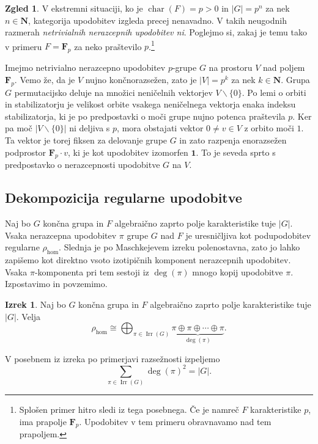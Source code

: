 \documentclass[11pt]{book}
\def\NN{\mathbf{N}}
\def\11{\mathbf{1}}
\def\FF{\mathbf{F}}
\DeclareMathOperator\Irr{Irr}
\DeclareMathOperator\characteristic{char}
\theoremstyle{definition}
\theoremstyle{zgled}
\newtheorem*{zgled}{Zgled}
\theoremstyle{odprtproblem}
\theoremstyle{domacanaloga}
\theoremstyle{izrek}
\newtheorem*{izrek}{Izrek}
\begin{document}
\begin{zgled}
V ekstremni situaciji, ko je $\characteristic(F) = p > 0$ in $|G| = p^n$ za nek $n \in \NN$, kategorija upodobitev izgleda precej nenavadno. V takih neugodnih razmerah \emph{netrivialnih nerazcepnih upodobitev ni}. Poglejmo si, zakaj je temu tako v primeru $F = \FF_p$ za neko praštevilo $p$.\footnote{Splošen primer hitro sledi iz tega posebnega. Če je namreč $F$ karakteristike $p$, ima prapolje $\FF_p$. Upodobitev v tem primeru obravnavamo nad tem prapoljem.}

Imejmo netrivialno nerazcepno upodobitev $p$-grupe $G$ na prostoru $V$ nad poljem $\FF_p$. Vemo že, da je $V$ nujno končnorazsežen, zato je $|V| = p^k$ za nek $k \in \NN$. Grupa $G$ permutacijsko deluje na množici neničelnih vektorjev $V \backslash \{ 0 \}$. Po lemi o orbiti in stabilizatorju je velikost orbite vsakega neničelnega vektorja enaka indeksu stabilizatorja, ki je po predpostavki o moči grupe nujno potenca praštevila $p$. Ker pa moč $|V \backslash \{ 0 \}|$ ni deljiva s $p$, mora obstajati vektor $0 \neq v \in V$ z orbito moči $1$. Ta vektor je torej fiksen za delovanje grupe $G$ in zato razpenja enorazsežen podprostor $\FF_p \cdot v$, ki je kot upodobitev izomorfen $\11$. To je seveda sprto s predpostavko o nerazcepnosti upodobitve $G$ na $V$.
\end{zgled}

\subsection{Dekompozicija regularne upodobitve}

Naj bo $G$ končna grupa in $F$ algebraično zaprto polje karakteristike tuje $|G|$. Vsaka nerazcepna upodobitev $\pi$ grupe $G$ nad $F$ je uresničljiva kot podupodobitev regularne $\rho_{\hom}$. Slednja je po Maschkejevem izreku polenostavna, zato jo lahko zapišemo kot direktno vsoto izotipičnih komponent nerazcepnih upodobitev. Vsaka $\pi$-komponenta pri tem sestoji iz $\deg(\pi)$ mnogo kopij upodobitve $\pi$. Izpostavimo in povzemimo.

\begin{izrek}
Naj bo $G$ končna grupa in $F$ algebraično zaprto polje karakteristike tuje $|G|$. Velja
\[
    \rho_{\hom} \cong \bigoplus_{\pi \in \Irr(G)} \underbrace{\pi \oplus \pi \oplus \cdots \oplus \pi}_{\deg(\pi)}.
\]
\end{izrek}

V posebnem iz izreka po primerjavi razsežnosti izpeljemo
\[
    \sum_{\pi \in \Irr(G)} \deg(\pi)^2 = |G|.
\]
\end{document}
